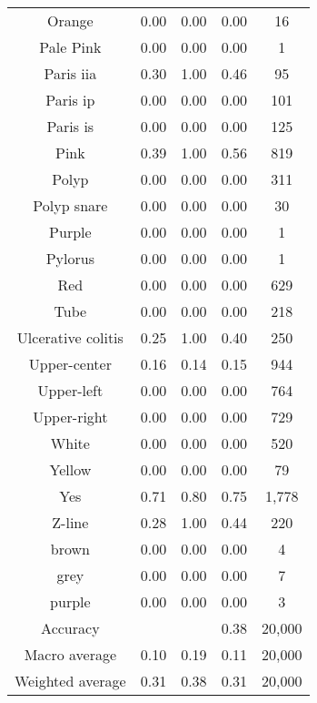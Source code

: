 \begin{center}
\begin{longtable}{|c|c|c|c|c|}
Orange  &   0.00  &  0.00  &  0.00  &    16 \\
Pale Pink  &   0.00  &  0.00  &  0.00   &  1 \\
Paris iia  &   0.30  &  1.00  &  0.46  &    95 \\
Paris ip  &   0.00  &  0.00  &  0.00  &   101 \\
Paris is  &   0.00  &  0.00  &  0.00  &   125 \\
Pink  &   0.39  &  1.00  &  0.56  &   819 \\
Polyp  &   0.00  &  0.00  &  0.00  &   311 \\
Polyp snare  &   0.00  &  0.00  &  0.00  &    30 \\
Purple  &   0.00  &  0.00  &  0.00   &  1 \\
Pylorus  &   0.00  &  0.00  &  0.00   &  1 \\
Red  &   0.00  &  0.00  &  0.00  &   629 \\
Tube  &   0.00  &  0.00  &  0.00  &   218 \\
Ulcerative colitis  &   0.25  &  1.00  &  0.40  &   250 \\
Upper-center  &   0.16  &  0.14  &  0.15  &   944 \\
Upper-left  &   0.00  &  0.00  &  0.00  &   764 \\
Upper-right  &   0.00  &  0.00  &  0.00  &   729 \\
White  &   0.00  &  0.00  &  0.00  &   520 \\
Yellow  &   0.00  &  0.00  &  0.00  &    79 \\
Yes  &   0.71  &  0.80  &  0.75  &  1,778 \\
Z-line  &   0.28  &  1.00  &  0.44  &   220 \\
brown  &   0.00  &  0.00  &  0.00   &  4 \\
grey  &   0.00  &  0.00  &  0.00   &  7 \\
purple  &   0.00  &  0.00  &  0.00   &  3 \\
\hline
Accuracy &  &  & 0.38 &  20,000 \\
Macro average &  0.10 &   0.19 &  0.11 &   20,000 \\
Weighted average  &  0.31 &   0.38 &  0.31 &   20,000 \\


\end{longtable}
\end{center}